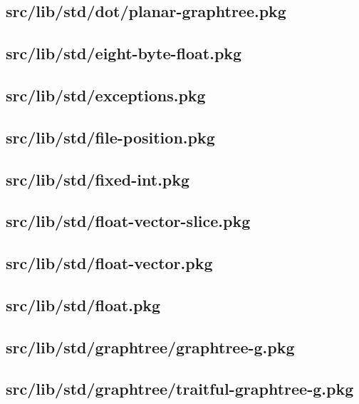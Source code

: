 \subsection{src/lib/std/dot/planar-graphtree.pkg}


\subsection{src/lib/std/eight-byte-float.pkg}


\subsection{src/lib/std/exceptions.pkg}


\subsection{src/lib/std/file-position.pkg}


\subsection{src/lib/std/fixed-int.pkg}


\subsection{src/lib/std/float-vector-slice.pkg}


\subsection{src/lib/std/float-vector.pkg}


\subsection{src/lib/std/float.pkg}


\subsection{src/lib/std/graphtree/graphtree-g.pkg}


\subsection{src/lib/std/graphtree/traitful-graphtree-g.pkg}


